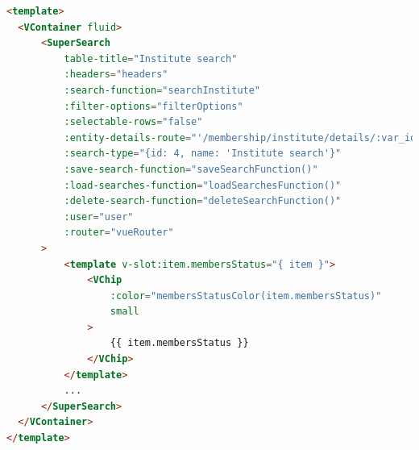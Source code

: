 \begin{lstlisting}[language=HTML, caption=Institute Search SFC template., label=lst:institute_sfc_template]
<template>
  <VContainer fluid>
      <SuperSearch
          table-title="Institute search"
          :headers="headers"
          :search-function="searchInstitute"
          :filter-options="filterOptions"
          :selectable-rows="false"
          :entity-details-route="'/membership/institute/details/:var_id'"
          :search-type="{id: 4, name: 'Institute search'}"
          :save-search-function="saveSearchFunction()"
          :load-searches-function="loadSearchesFunction()"
          :delete-search-function="deleteSearchFunction()"
          :user="user"
          :router="vueRouter"
      >
          <template v-slot:item.membersStatus="{ item }">
              <VChip
                  :color="membersStatusColor(item.membersStatus)"
                  small
              >
                  {{ item.membersStatus }}
              </VChip>
          </template>
          ...
      </SuperSearch>
  </VContainer>
</template>
\end{lstlisting}

